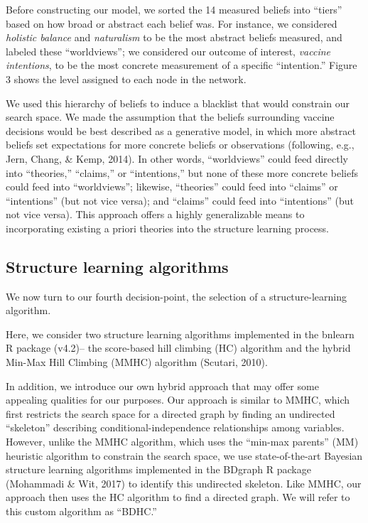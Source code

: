 \documentclass[10pt, letterpaper]{article}
\begin{document}
Before constructing our model, we sorted the 14 measured beliefs into
``tiers'' based on how broad or abstract each belief was. For instance,
we considered \emph{holistic balance} and \emph{naturalism} to be the
most abstract beliefs measured, and labeled these ``worldviews''; we
considered our outcome of interest, \emph{vaccine intentions}, to be the
most concrete measurement of a specific ``intention.'' Figure 3 shows
the level assigned to each node in the network.

We used this hierarchy of beliefs to induce a blacklist that would
constrain our search space. We made the assumption that the beliefs
surrounding vaccine decisions would be best described as a generative
model, in which more abstract beliefs set expectations for more concrete
beliefs or observations (following, e.g., Jern, Chang, \& Kemp, 2014).
In other words, ``worldviews'' could feed directly into ``theories,''
``claims,'' or ``intentions,'' but none of these more concrete beliefs
could feed into ``worldviews''; likewise, ``theories'' could feed into
``claims'' or ``intentions'' (but not vice versa); and ``claims'' could
feed into ``intentions'' (but not vice versa). This approach offers a
highly generalizable means to incorporating existing a priori theories
into the structure learning process.

\subsection{Structure learning
algorithms}\label{structure-learning-algorithms}

We now turn to our fourth decision-point, the selection of a
structure-learning algorithm.

Here, we consider two structure learning algorithms implemented in the
bnlearn R package (v4.2)-- the score-based hill climbing (HC) algorithm
and the hybrid Min-Max Hill Climbing (MMHC) algorithm (Scutari, 2010).

In addition, we introduce our own hybrid approach that may offer some
appealing qualities for our purposes. Our approach is similar to MMHC,
which first restricts the search space for a directed graph by finding
an undirected ``skeleton'' describing conditional-independence
relationships among variables. However, unlike the MMHC algorithm, which
uses the ``min-max parents'' (MM) heuristic algorithm to constrain the
search space, we use state-of-the-art Bayesian structure learning
algorithms implemented in the BDgraph R package (Mohammadi \& Wit, 2017)
to identify this undirected skeleton. Like MMHC, our approach then uses
the HC algorithm to find a directed graph. We will refer to this custom
algorithm as ``BDHC.''
\end{document}
